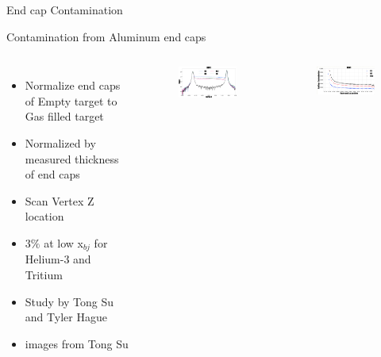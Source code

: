 \documentclass{beamer}
\begin{document}
\begin{frame}{End cap Contamination}
	\begin{block}{Contamination from Aluminum end caps}
		\begin{columns}
		\begin{itemize}
			\item Normalize end caps of Empty target to Gas filled target
			\item Normalized by measured thickness of end caps
			\item Scan Vertex Z location
			\item $3\%$ at low x$_{bj}$ for Helium-3 and Tritium
			\item Study by Tong Su and Tyler Hague
			\item images from Tong Su
		\end{itemize}
	
		\begin{figure}
			\includegraphics[width=5.0cm]{../images/ECC_kin1.pdf}
		\end{figure}
		\begin{figure}
			\includegraphics[width=5.0cm]{../images/ECC1_kin1.pdf}
		\end{figure}
	
		\end{columns}		
	\end{block}

\end{frame}
\end{document}
